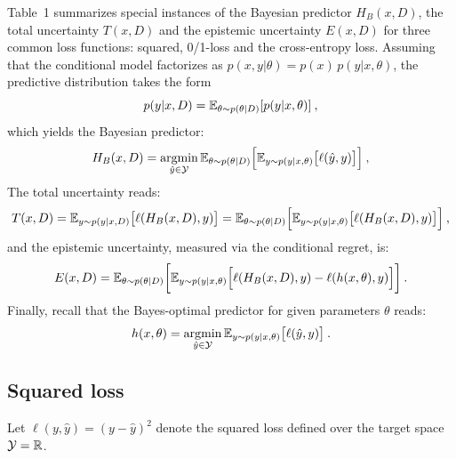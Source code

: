 Table~1 summarizes special instances of the Bayesian predictor $H_B(x,D)$, the total uncertainty $T(x,D)$ and the epistemic uncertainty $E(x,D)$ for three common loss functions: squared, 0/1-loss and the cross-entropy loss. Assuming that the conditional model factorizes as $p(x,y|\theta)=p(x)\,p(y|x,\theta)$, the predictive distribution takes the form 
\[p(y|x,D)={\mathbb{E}}_{\theta\sim p(\theta|D)}[p(y|x,\theta)]\:,
\]
which yields the Bayesian predictor:
\[
 H_B(x,D)=\mathop{\rm argmin}_{\hat{y}\in{\cal Y}} {\mathbb{E}}_{\theta\sim p(\theta|D)} \Big [{\mathbb{E}}_{y\sim p(y|x,\theta)}\big[ \ell(\hat{y},y) \big ]\Big ] \:,
\]
%
The total uncertainty reads:
\[
 T(x,D)= {\mathbb{E}}_{y\sim p(y|x,D)}\big[ \ell(H_B(x,D),y) \big ] =
 {\mathbb{E}}_{\theta\sim p(\theta|D)} \Big [{\mathbb{E}}_{y\sim p(y|x,\theta)}\big[ \ell(H_B(x,D),y) \big ]\Big ] \:,
\]
and the epistemic uncertainty, measured via the conditional regret, is:
\[
 E(x,D) = {\mathbb{E}}_{\theta\sim p(\theta|D)} \bigg [{\mathbb{E}}_{y\sim p(y|x,\theta)}\Big[ \ell(H_B(x,D),y)-\ell(h(x,\theta),y) \Big ]\bigg ]\:.
\]
Finally, recall that the Bayes-optimal predictor for given parameters $\theta$ reads:
\[
  h(x,\theta) = \mathop{\rm argmin}_{\hat{y}\in{\cal Y}} {\mathbb{E}}_{y\sim p(y|x,\theta)}\big [ \ell(\hat{y},y)\big ]\:.
\]


\subsection*{Squared loss}

Let $\ell(y,\hat{y})=(y-\hat{y})^2$ denote the  squared loss defined over the target space ${\cal Y}=\mathbb{R}$. 

